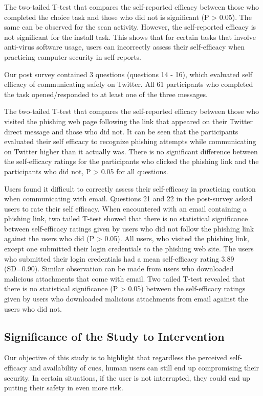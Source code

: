 \documentclass[doctor]{thesis} %
\theoremstyle{plain}
\begin{document}
The two-tailed T-test that compares the self-reported efficacy between those who completed the choice task and those who did not is significant (P > 0.05). The same can be observed for the scan activity. However, the self-reported efficacy is not significant for the install task. This shows that for certain tasks that involve anti-virus software usage, users can incorrectly assess their self-efficacy when practicing computer security in self-reports.

Our post survey contained 3 questions (questions 14 - 16), which evaluated self efficacy of communicating safely on Twitter. All 61 participants who completed the task opened/responded to at least one of the three messages.

The two-tailed T-test that compares the self-reported efficacy between those who visited the phishing web page following the link that appeared on their Twitter direct message and those who did not. It can be seen that the participants evaluated their self efficacy to recognize phishing attempts while communicating on Twitter higher than it actually was. There is no significant difference between the self-efficacy ratings for the participants who clicked the phishing link and the participants who did not, P > 0.05 for all questions.

Users found it difficult to correctly assess their self-efficacy in practicing caution when communicating with email. Questions 21 and 22 in the post-survey asked users to rate their self efficacy. When encountered with an email containing a phishing link, two tailed T-test showed that there is no statistical significance between self-efficacy ratings given by users who did not follow the phishing link against the users who did (P > 0.05). All users, who visited the phishing link, except one submitted their login credentials to the phishing web site. The users who submitted their login credentials had a mean self-efficacy rating 3.89 (SD=0.90). Similar observation can be made from users who downloaded malicious attachments that come with email. Two tailed T-test revealed that there is no statistical significance (P > 0.05) between the self-efficacy ratings given by users who downloaded malicious attachments  from email against the users who did not.


\subsection*{Significance of the Study to Intervention}
Our objective of this study is to highlight that regardless the perceived self-efficacy and availability of cues, human users can still end up compromising their security. In certain situations, if the user is not interrupted, they could end up putting their safety in even more risk.
\end{document}
